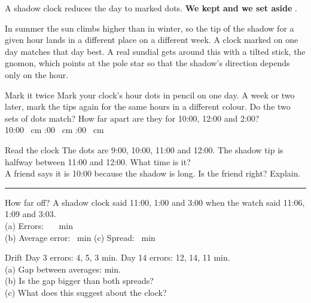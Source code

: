 \begin{keepbox}
A shadow clock reduces the day to marked dots. \textbf{We kept} \wline[3.4cm] \textbf{and we set aside} \wline[3.4cm].
\end{keepbox}

\clearpage

In summer the sun climbs higher than in winter, so the tip of the shadow for a given hour lands in a different place on a different week. A clock marked on one day matches that day best. A real sundial gets around this with a tilted stick, the gnomon, which points at the pole star so that the shadow's direction depends only on the hour.

\begin{tryit}{Mark it twice}
Mark your clock's hour dots in pencil on one day. A week or two later, mark the tips again for the same hours in a different colour. Do the two sets of dots match? How far apart are they for 10:00, 12:00 and 2:00?\\[4pt]
10:00 \wline[1.6cm]~cm :00 \wline[1.6cm]~cm :00 \wline[1.6cm]~cm
\end{tryit}

\begin{puzzle}{Read the clock}
The dots are 9:00, 10:00, 11:00 and 12:00. The shadow tip is halfway between 11:00 and 12:00. What time is it? \wline[2cm]\\
A friend says it is 10:00 because the shadow is long. Is the friend right? Explain.\\
\rule{\linewidth}{0.5pt}
\end{puzzle}

\begin{puzzle}{How far off?}
A shadow clock said 11:00, 1:00 and 3:00 when the watch said 11:06, 1:09 and 3:03.\\
(a) Errors: \wline[1.4cm]~\wline[1.4cm]~\wline[1.4cm]~min\\
(b) Average error: \wline[1.6cm]~min \quad (c) Spread: \wline[1.4cm]~min
\end{puzzle}

\begin{puzzle}{Drift}
Day 3 errors: 4, 5, 3 min. Day 14 errors: 12, 14, 11 min.\\
(a) Gap between averages: \wline[1.6cm] min.\\
(b) Is the gap bigger than both spreads? \wline[1.6cm]\\
(c) What does this suggest about the clock? \wline[4cm]
\end{puzzle}

